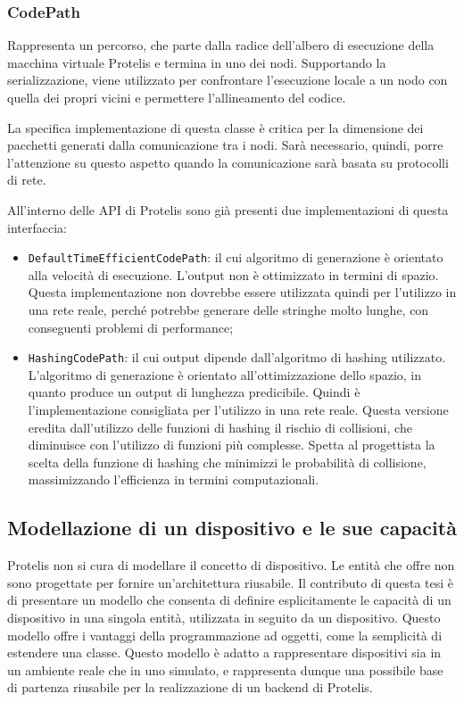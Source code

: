 \subsubsection{CodePath}
Rappresenta un percorso, che parte dalla radice dell'albero di esecuzione della
macchina virtuale Protelis e termina in uno dei nodi. Supportando la
serializzazione, viene utilizzato per confrontare l'esecuzione locale a un nodo
con quella dei propri vicini e permettere l'allineamento del codice.

La specifica implementazione di questa classe è critica per la dimensione dei
pacchetti generati dalla comunicazione tra i nodi. Sarà necessario, quindi,
porre l'attenzione su questo aspetto quando la comunicazione sarà basata su
protocolli di rete.

All'interno delle API di Protelis sono già presenti due implementazioni di
questa interfaccia:
\begin{itemize}
\item \texttt{DefaultTimeEfficientCodePath}: il cui algoritmo di generazione è
  orientato alla velocità di esecuzione. L'output non è ottimizzato in termini
  di spazio. Questa implementazione non dovrebbe essere utilizzata quindi per
  l'utilizzo in una rete reale, perché potrebbe generare delle stringhe molto
  lunghe, con conseguenti problemi di performance;
\item \texttt{HashingCodePath}: il cui output dipende dall'algoritmo di hashing
  utilizzato. L'algoritmo di generazione è orientato all'ottimizzazione dello
  spazio, in quanto produce un output di lunghezza predicibile. Quindi è
  l'implementazione consigliata per l'utilizzo in una rete reale. Questa
  versione eredita dall'utilizzo delle funzioni di hashing il rischio di
  collisioni, che diminuisce con l'utilizzo di funzioni più complesse. Spetta al
  progettista la scelta della funzione di hashing che minimizzi le probabilità
  di collisione, massimizzando l'efficienza in termini computazionali.
\end{itemize}

\subsection{Modellazione di un dispositivo e le sue capacità}
Protelis non si cura di modellare il concetto di dispositivo. Le entità che
offre non sono progettate per fornire un'architettura riusabile.  Il contributo
di questa tesi è di presentare un modello che consenta di definire
esplicitamente le capacità di un dispositivo in una singola entità, utilizzata
in seguito da un dispositivo. Questo modello offre i vantaggi della
programmazione ad oggetti, come la semplicità di estendere una classe. Questo
modello è adatto a rappresentare dispositivi sia in un ambiente reale che in uno
simulato, e rappresenta dunque una possibile base di partenza riusabile per la
realizzazione di un backend di Protelis.

